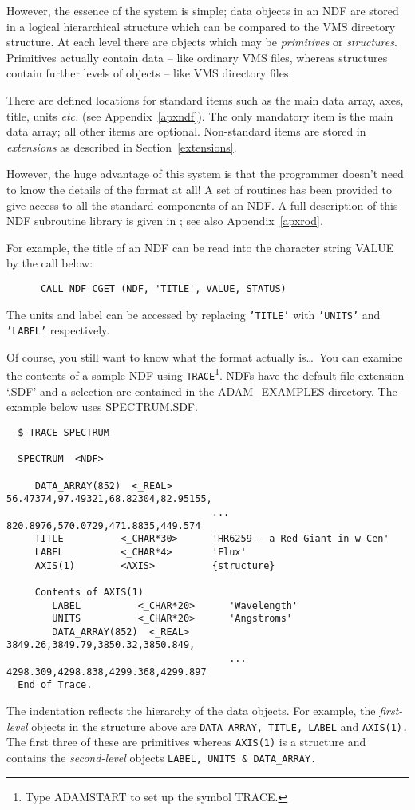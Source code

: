 However, the essence of the system is simple; data objects in an NDF 
are stored in a 
logical hierarchical structure which can be compared to the VMS 
directory structure.
At each level there are objects which may be {\sl primitives\/}
or {\sl structures}.
Primitives actually contain data -- like ordinary VMS files, whereas
structures contain further levels of objects -- like VMS directory files.

There are defined locations for standard items such as the main data array,
axes, title, units {\it etc.} (see Appendix~\ref{apxndf}).
The only mandatory item is the main data 
array; all other items are optional. 
Non-standard items are stored in {\sl extensions\/} 
as described in Section~\ref{extensions}.

However, the huge advantage of this system is that the programmer  
doesn't need to know the details of the
format at all!
A set of routines has been provided to give access
to all the standard components of an NDF.
A full description of this NDF subroutine library is given in
;
see also Appendix~\ref{apxrod}.


For example, the title of an NDF can be read into the character string 
VALUE by the call below:
\begin{verbatim}
      CALL NDF_CGET (NDF, 'TITLE', VALUE, STATUS)
\end{verbatim}
The units and label can be accessed by replacing 
{\tt 'TITLE'} with {\tt 'UNITS'} and {\tt 'LABEL'} respectively.

Of course, you still want to know what the format actually is\ldots\ 
You can examine the contents of a sample NDF 
using {\tt TRACE}\footnote{Type ADAMSTART to set up the symbol TRACE.}. 
NDFs have the default file extension `.SDF' and a selection are
contained in the  ADAM\_EXAMPLES directory.
The example below uses SPECTRUM.SDF.
\begin{verbatim}
  $ TRACE SPECTRUM

  SPECTRUM  <NDF>

     DATA_ARRAY(852)  <_REAL>       56.47374,97.49321,68.82304,82.95155,
                                    ... 820.8976,570.0729,471.8835,449.574
     TITLE          <_CHAR*30>      'HR6259 - a Red Giant in w Cen'
     LABEL          <_CHAR*4>       'Flux'
     AXIS(1)        <AXIS>          {structure}

     Contents of AXIS(1)
        LABEL          <_CHAR*20>      'Wavelength'
        UNITS          <_CHAR*20>      'Angstroms'
        DATA_ARRAY(852)  <_REAL>       3849.26,3849.79,3850.32,3850.849,
                                       ... 4298.309,4298.838,4299.368,4299.897
  End of Trace.
\end{verbatim}
The indentation reflects the hierarchy of the data objects.
For example, the {\sl first-level\/} objects in the structure above are
{\tt  DATA\_ARRAY, TITLE, LABEL} and {\tt AXIS(1).}
The first three of these are primitives whereas
{\tt AXIS(1)} is a structure and contains the {\sl second-level\/}
objects {\tt LABEL, UNITS \& DATA\_ARRAY.}

